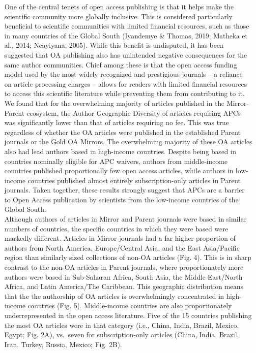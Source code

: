 \documentclass[
  english,
  man]{apa6}
\begin{document}
One of the central tenets of open access publishing is that it helps make the scientific community more globally inclusive. This is considered particularly beneficial to scientific communities with limited financial resources, such as those in many countries of the Global South (Iyandemye \& Thomas, 2019; Matheka et al., 2014; Ncayiyana, 2005). While this benefit is undisputed, it has been suggested that OA publishing also has unintended negative consequences for the same author communities. Chief among these is that the open access funding model used by the most widely recognized and prestigious journals -- a reliance on article processing charges -- allows for readers with limited financial resources to access this scientific literature while preventing them from contributing to it. We found that for the overwhelming majority of articles published in the Mirror-Parent ecosystem, the Author Geographic Diversity of articles requiring APCs was significantly lower than that of articles requiring no fee. This was true regardless of whether the OA articles were published in the established Parent journals or the Gold OA Mirrors. The overwhelming majority of these OA articles also had lead authors based in high-income countries. Despite being based in countries nominally eligible for APC waivers, authors from middle-income countries published proportionally few open access articles, while authors in low-income countries published almost entirely subscription-only articles in Parent journals. Taken together, these results strongly suggest that APCs are a barrier to Open Access publication by scientists from the low-income countries of the Global South.\\
Although authors of articles in Mirror and Parent journals were based in similar numbers of countries, the specific countries in which they were based were markedly different. Articles in Mirror journals had a far higher proportion of authors from North America, Europe/Central Asia, and the East Asia/Pacific region than similarly sized collections of non-OA articles (Fig. 4). This is in sharp contrast to the non-OA articles in Parent journals, where proportionately more authors were based in Sub-Saharan Africa, South Asia, the Middle East/North Africa, and Latin America/The Caribbean. This geographic distribution means that the the authorship of OA articles is overwhelmingly concentrated in high-income countries (Fig. 5). Middle-income countries are also proportionately underrepresented in the open access literature. Five of the 15 countries publishing the most OA articles were in that category (i.e., China, India, Brazil, Mexico, Egypt; Fig. 2A), vs.~seven for subscription-only articles (China, India, Brazil, Iran, Turkey, Russia, Mexico; Fig. 2B).\\
\end{document}
